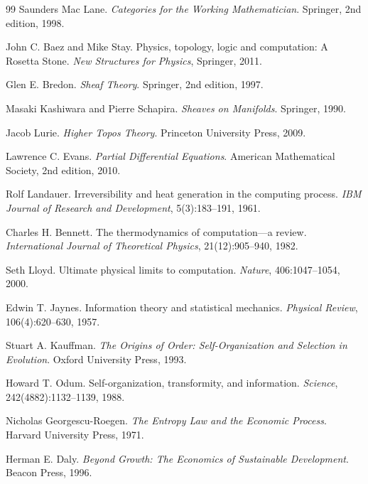 \documentclass[11pt]{article}
\theoremstyle{plain}
\theoremstyle{definition}
\theoremstyle{remark}
\begin{document}
\begin{thebibliography}{99}
Saunders Mac Lane.
\newblock \emph{Categories for the Working Mathematician}.
\newblock Springer, 2nd edition, 1998.

John C. Baez and Mike Stay.
\newblock Physics, topology, logic and computation: A Rosetta Stone.
\newblock \emph{New Structures for Physics}, Springer, 2011.

Glen E. Bredon.
\newblock \emph{Sheaf Theory}.
\newblock Springer, 2nd edition, 1997.

Masaki Kashiwara and Pierre Schapira.
\newblock \emph{Sheaves on Manifolds}.
\newblock Springer, 1990.

Jacob Lurie.
\newblock \emph{Higher Topos Theory}.
\newblock Princeton University Press, 2009.

Lawrence C. Evans.
\newblock \emph{Partial Differential Equations}.
\newblock American Mathematical Society, 2nd edition, 2010.

Rolf Landauer.
\newblock Irreversibility and heat generation in the computing process.
\newblock \emph{IBM Journal of Research and Development}, 5(3):183--191, 1961.

Charles H. Bennett.
\newblock The thermodynamics of computation---a review.
\newblock \emph{International Journal of Theoretical Physics}, 21(12):905--940, 1982.

Seth Lloyd.
\newblock Ultimate physical limits to computation.
\newblock \emph{Nature}, 406:1047--1054, 2000.

Edwin T. Jaynes.
\newblock Information theory and statistical mechanics.
\newblock \emph{Physical Review}, 106(4):620--630, 1957.

Stuart A. Kauffman.
\newblock \emph{The Origins of Order: Self-Organization and Selection in Evolution}.
\newblock Oxford University Press, 1993.

Howard T. Odum.
\newblock Self-organization, transformity, and information.
\newblock \emph{Science}, 242(4882):1132--1139, 1988.

Nicholas Georgescu-Roegen.
\newblock \emph{The Entropy Law and the Economic Process}.
\newblock Harvard University Press, 1971.

Herman E. Daly.
\newblock \emph{Beyond Growth: The Economics of Sustainable Development}.
\newblock Beacon Press, 1996.


\end{thebibliography}
\end{document}
